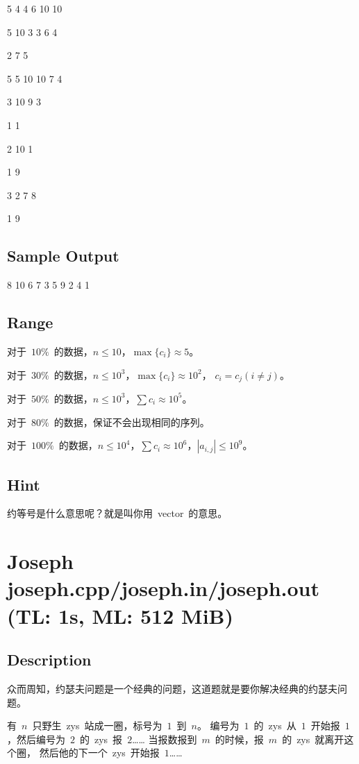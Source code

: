 \documentclass[12pt, hyperref, UTF8]{article}
\begin{document}
	5 4 4 6 10 10
	
	5 10 3 3 6 4
	
	2 7 5
	
	5 5 10 10 7 4
	
	3 10 9 3
	
	1 1
	
	2 10 1
	
	1 9
	
	3 2 7 8

	1 9

	\subsection{Sample Output}
	8 10 6 7 3 5 9 2 4 1

	\subsection{Range}
	对于~$10\%$~的数据，$n \le 10$，$\max \{ c_i \} \approx 5$。

	对于~$30\%$~的数据，$n \le 10^3$，$\max\{ c_i \} \approx 10^2$，
	$c_i = c_j (i \ne j)$。

	对于~$50\%$~的数据，$n \le 10^3$，$\sum c_i \approx 10^5$。
	
	对于~$80\%$~的数据，保证不会出现相同的序列。

	对于~$100\%$~的数据，$n \le 10^4$，$\sum c_i \approx 10^6$，$|a_{i, j}| \le 10^9$。

	\subsection{Hint}
	约等号是什么意思呢？就是叫你用~vector~的意思。

	\newpage
	\section{Joseph \small{joseph.cpp/joseph.in/joseph.out
	(TL: 1s, ML: 512 MiB)}}

	\subsection{Description}
	众而周知，约瑟夫问题是一个经典的问题，这道题就是要你解决经典的约瑟夫问题。

	\bigskip

	有~$n$~只野生~zys~站成一圈，标号为~$1$~到~$n$。
	编号为~$1$~的~zys~从~$1$~开始报~$1$，然后编号为~$2$~的~zys~报~$2$……
	当报数报到~$m$~的时候，报~$m$~的~zys~就离开这个圈，
	然后他的下一个~zys~开始报~$1$……
\end{document}
